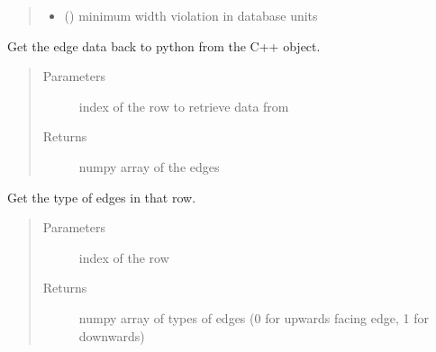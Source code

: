 \documentclass[a4paper,10pt,english]{sphinxmanual}
\begin{document}
\begin{fulllineitems}
\begin{fulllineitems}
\begin{quote}
\begin{description}
\begin{itemize}
\item {} 
 () \textendash{} minimum width violation in database units

\end{itemize}

\end{description}\end{quote}

\end{fulllineitems}


\begin{fulllineitems}
\label{\detokenize{drc/drc:kppc.drc.kppc.drc.slcleaner.PyDrcSl.get_row}}
Get the edge data back to python from the C++ object.
\begin{quote}\begin{description}
\item[{Parameters}] \leavevmode
{} \textendash{} index of the row to retrieve data from

\item[{Returns}] \leavevmode
numpy array of the edges

\end{description}\end{quote}

\end{fulllineitems}


\begin{fulllineitems}
\label{\detokenize{drc/drc:kppc.drc.kppc.drc.slcleaner.PyDrcSl.get_row_types}}
Get the type of edges in that row.
\begin{quote}\begin{description}
\item[{Parameters}] \leavevmode
{} \textendash{} index of the row

\item[{Returns}] \leavevmode
numpy array of types of edges (0 for upwards facing edge, 1 for downwards)


\end{description}
\end{quote}
\end{fulllineitems}
\end{fulllineitems}
\end{document}
